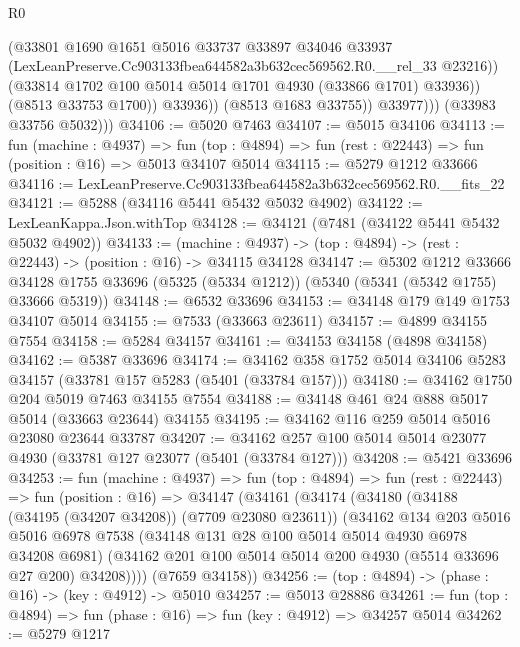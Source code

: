 \begin{lexlean}{R0}
\begin{coremodule}
                        (@33801
                          @1690
                          @1651
                          @5016
                          @33737
                          @33897
                          @34046
                          @33937
                          (LexLeanPreserve.Cc903133fbea644582a3b632cec569562.R0.__rel_33 @23216))
                        (@33814 @1702 @100 @5014 @5014 @1701 @4930 (@33866 @1701) @33936))
                      (@8513 @33753 @1700))
                    @33936))
                (@8513 @1683 @33755))
              @33977)))
        (@33983 @33756 @5032)))
@34106 := @5020 @7463
@34107 := @5015 @34106
@34113 := fun (machine : @4937) =>
  fun (top : @4894) => fun (rest : @22443) => fun (position : @16) => @5013 @34107 @5014
@34115 := @5279 @1212 @33666
@34116 := LexLeanPreserve.Cc903133fbea644582a3b632cec569562.R0.__fits_22
@34121 := @5288 (@34116 @5441 @5432 @5032 @4902)
@34122 := LexLeanKappa.Json.withTop
@34128 := @34121 (@7481 (@34122 @5441 @5432 @5032 @4902))
@34133 := (machine : @4937) -> (top : @4894) -> (rest : @22443) -> (position : @16) -> @34115 @34128
@34147 := @5302
    @1212
    @33666
    @34128
    @1755
    @33696
    (@5325 (@5334 @1212))
    (@5340 (@5341 (@5342 @1755) @33666 @5319))
@34148 := @6532 @33696
@34153 := @34148 @179 @149 @1753 @34107 @5014
@34155 := @7533 (@33663 @23611)
@34157 := @4899 @34155 @7554
@34158 := @5284 @34157
@34161 := @34153 @34158 (@4898 @34158)
@34162 := @5387 @33696
@34174 := @34162 @358 @1752 @5014 @34106 @5283 @34157 (@33781 @157 @5283 (@5401 (@33784 @157)))
@34180 := @34162 @1750 @204 @5019 @7463 @34155 @7554
@34188 := @34148 @461 @24 @888 @5017 @5014 (@33663 @23644) @34155
@34195 := @34162 @116 @259 @5014 @5016 @23080 @23644 @33787
@34207 := @34162 @257 @100 @5014 @5014 @23077 @4930 (@33781 @127 @23077 (@5401 (@33784 @127)))
@34208 := @5421 @33696
@34253 := fun (machine : @4937) =>
  fun (top : @4894) =>
  fun (rest : @22443) =>
  fun (position : @16) =>
  @34147
    (@34161
      (@34174
        (@34180
          (@34188 (@34195 (@34207 @34208)) (@7709 @23080 @23611))
          (@34162
            @134
            @203
            @5016
            @5016
            @6978
            @7538
            (@34148 @131 @28 @100 @5014 @5014 @4930 @6978 @34208 @6981)
            (@34162 @201 @100 @5014 @5014 @200 @4930 (@5514 @33696 @27 @200) @34208))))
      (@7659 @34158))
@34256 := (top : @4894) -> (phase : @16) -> (key : @4912) -> @5010
@34257 := @5013 @28886
@34261 := fun (top : @4894) => fun (phase : @16) => fun (key : @4912) => @34257 @5014
@34262 := @5279 @1217

\end{coremodule}
\end{lexlean}
